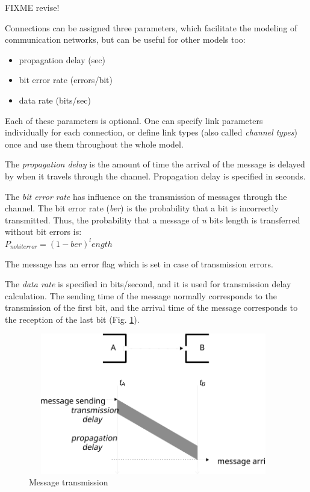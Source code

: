 FIXME revise!

Connections can be assigned three parameters, which facilitate
the modeling of communication networks, but can be useful for
other models too:
\begin{itemize}
  \item{propagation delay (sec)}
  \item{bit error rate (errors/bit)}
  \item{data rate (bits/sec)}
\end{itemize}


Each of these parameters is optional. One can specify link parameters
individually for each connection, or define link types (also
called \textit{channel} \textit{types}) once and use them throughout the
whole model.

The \textit{propagation delay} is the amount of time the arrival of
the message is delayed by when it travels through the channel.
Propagation delay is specified in seconds.

The \textit{bit error rate} has influence on the transmission of messages
through the channel. The bit error rate (\textit{ber}) is the probability that
a bit is incorrectly transmitted. Thus, the probability that
a message of \textit{n} bits length is transferred without bit errors is:\\

$P_{no bit error} = (1 - ber)^length$

The message has an error flag which is set in case of transmission
errors.

The \textit{data rate} is specified in bits/second, and it is used
for transmission delay calculation. The sending time of the message
normally corresponds to the transmission of the first bit, and
the arrival time of the message corresponds to the reception
of the last bit (Fig. \ref{fig:ch-overview:message-transm}).

\begin{figure}[htbp]
\begin{center}
\includegraphics[width=4.301in, height=2.417in]{figures/transmission}
\caption{Message transmission}
\label{fig:ch-overview:message-transm}
\end{center}
\end{figure}

